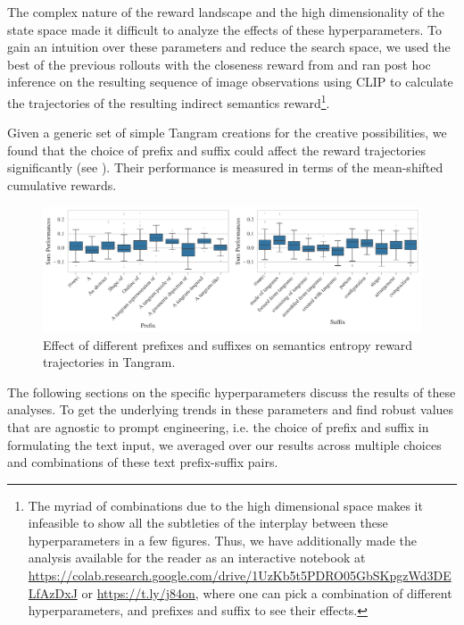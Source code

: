 The complex nature of the reward landscape and the high dimensionality of the state space made it difficult to analyze the effects of these hyperparameters.
To gain an intuition over these parameters and reduce the search space, we used the best of the previous rollouts with the closeness reward from  and ran post hoc inference on the resulting sequence of image observations using CLIP to calculate the trajectories of the resulting indirect semantics reward\footnote{The myriad of combinations due to the high dimensional space makes it infeasible to show all the subtleties of the interplay between these hyperparameters in a few figures.
Thus, we have additionally made the analysis available for the reader as an interactive notebook at \url{https://colab.research.google.com/drive/1UzKb5t5PDRO05GbSKpgzWd3DELfAzDxJ} or \url{https://t.ly/j84on}, where one can pick a combination of different hyperparameters, and prefixes and suffix to see their effects.}.

Given a generic set of simple Tangram creations for the creative possibilities, we found that the choice of prefix and suffix could affect the reward trajectories significantly (see ).
Their performance is measured in terms of the mean-shifted cumulative rewards.

\begin{figure}[h]
    \centering
    \includegraphics[width=\textwidth]{images/prefix-suffix.pdf}
    \caption{Effect of different prefixes and suffixes on semantics entropy reward trajectories in Tangram.}
    \label{fig:prefix-suffix}
\end{figure}
\vspace{-7pt}
The following sections on the specific hyperparameters discuss the results of these analyses.
To get the underlying trends in these parameters and find robust values that are agnostic to prompt engineering, i.e. the choice of prefix and suffix in formulating the text input, we averaged over our results across multiple choices and combinations of these text prefix-suffix pairs.

